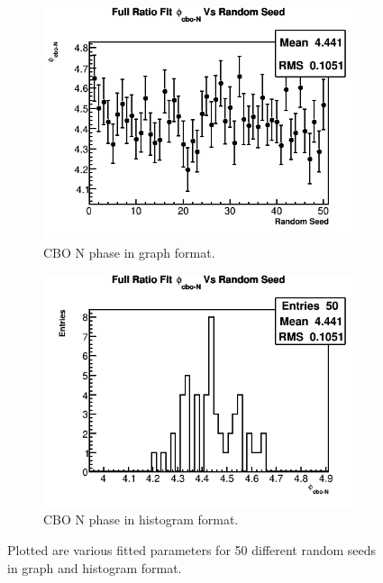 \begin{figure}[]
		   	\vspace{4mm}
		   	\begin{subfigure}[t]{0.45\textwidth}
			    \centering
				\includegraphics[width=\textwidth]{RatioCBO_phi_cbo-N_Vs_Iter_Canv}
			    \caption{CBO N phase in graph format.}
		    \end{subfigure}
		    \hspace{4mm}
		    \begin{subfigure}[t]{0.45\textwidth}
			    \centering
				\includegraphics[width=\textwidth]{RatioCBO_phi_cbo-N_Vs_Iter_Canv_hist}
			    \caption{CBO N phase in histogram format.}
		    \end{subfigure}%
		\caption[RandomSeedsPars3]{Plotted are various fitted parameters for 50 different random seeds in graph and histogram format.}
		\label{fig:RandomSeedsPars3}
		\end{figure}
		

